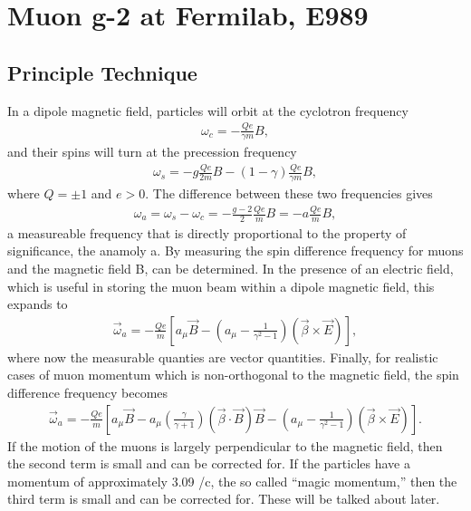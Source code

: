 
\thispagestyle{myheadings} %

\graphicspath{{Body/Figures/ExperimentalOverview/Decay/}{Body/Figures/TrackingFigures/TrackerPics/}{Body/Figures/ExperimentalOverview/Ring/}{Body/Figures/ExperimentalOverview/Auxiliary/}}

\chapter{Muon g-2 at Fermilab, E989}
\label{chapter:Muon g-2 at Fermilab, E989}

\section{Principle Technique}
\label{sec:PrincipleTechnique}

In a dipole magnetic field, particles will orbit at the cyclotron frequency 
        \begin{align} \label{eq:wc}
        	\omega_{c} = -\frac{Qe}{\gamma m}B,
        \end{align}
and their spins will turn at the precession frequency
        \begin{align} \label{eq:ws}
        	\omega_{s} = -g\frac{Qe}{2m}B - (1-\gamma)\frac{Qe}{\gamma m}B,
        \end{align}
where $Q = \pm 1$ and $e > 0$. The difference between these two frequencies gives
        \begin{align} \label{eq:wasimple}
        	\omega_{a} = \omega_{s} - \omega_{c} = -\frac{g-2}{2}\frac{Qe}{m}B = - a \frac{Qe}{m}B,
        \end{align}
a measureable frequency that is directly proportional to the property of significance, the anamoly a. By measuring the spin difference frequency for muons and the magnetic field B, \amu can be determined. In the presence of an electric field, which is useful in storing the muon beam within a dipole magnetic field, this expands to 
        \begin{align} \label{eq:waelectric}
            \vec{\omega}_{a} = -\frac{Qe}{m} [a_{\mu}\vec{B} - (a_{\mu} - \frac{1}{\gamma^{2}-1})(\vec{\beta} \times \vec{E}) ],
        \end{align}
where now the measurable quanties are vector quantities. Finally, for realistic cases of muon momentum which is non-orthogonal to the magnetic field, the spin difference frequency becomes
        \begin{align} \label{eq:wafinal}
            \vec{\omega}_{a} = -\frac{Qe}{m} [a_{\mu}\vec{B} - a_{\mu} (\frac{\gamma}{\gamma+1})(\vec{\beta} \cdot \vec{B})\vec{B} - (a_{\mu} - \frac{1}{\gamma^{2}-1})(\vec{\beta} \times \vec{E}) ].
        \end{align}
If the motion of the muons is largely perpendicular to the magnetic field, then the second term is small and can be corrected for. If the particles have a momentum of approximately 3.09 \GeV/c, the so called ``magic momentum,'' then the third term is small and can be corrected for. These will be talked about later.


